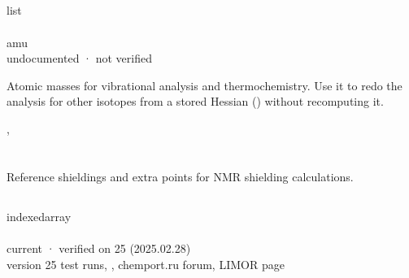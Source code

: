 \documentclass[letterpaper,10pt,english,openany,oneside]{sphinxmanual}
\begin{document}
\subsection{}
\label{\detokenize{reference/thermo:mass}}\label{\detokenize{reference/thermo:thermo-mass}}
\ignorespaces 
\sphinxAtStartPar
{} list\\
 \\
 amu\\
 undocumented · not verified\\
 

\sphinxAtStartPar
Atomic masses for vibrational analysis and thermochemistry. Use it to redo the analysis for other isotopes
from a stored Hessian () without recomputing it.

\sphinxAtStartPar
{} {\hyperref[\detokenize{reference/molecule:molecule-mass}]{}}, {\hyperref[\detokenize{reference/Energy:energy-h}]{}}

\sphinxstepscope




\section{}
\label{\detokenize{reference/nmr:nmr}}\label{\detokenize{reference/nmr:group-nmr}}\label{\detokenize{reference/nmr::doc}}
\ignorespaces 
\sphinxAtStartPar
Reference shieldings and extra points for NMR shielding calculations.

\sphinxAtStartPar
{} 


\subsection{}
\label{\detokenize{reference/nmr:standard}}\label{\detokenize{reference/nmr:nmr-standard}}
\ignorespaces 
\sphinxAtStartPar
{} indexed\sphinxhyphen{}array\\
 \\
 current · verified on 25 (2025.02.28)\\
 version 25 test runs, , chemport.ru forum, LIMOR page
\end{document}
